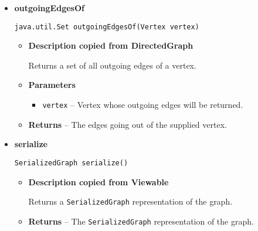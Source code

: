 {{{{{{{{{{{{{{{\begin{itemize}
{\begin{itemize}
{Returns the outdegree of a vertex of the graph.
}
\item{
{\bf  Parameters}
  \begin{itemize}
   \item{
\texttt{vertex} -- Vertex whose outdegree will be returned.}
  \end{itemize}
}%
\item{{\bf  Returns} -- 
The number of edges going out of the supplied vertex. 
}%
\end{itemize}
}%
\item{ 
{\bf  outgoingEdgesOf}\\
\begin{lstlisting}[frame=none]
java.util.Set outgoingEdgesOf(Vertex vertex)\end{lstlisting} %
\begin{itemize}
\item{
{\bf  Description copied from DirectedGraph{\small {}} }

Returns a set of all outgoing edges of a vertex.
}
\item{
{\bf  Parameters}
  \begin{itemize}
   \item{
\texttt{vertex} -- Vertex whose outgoing edges will be returned.}
  \end{itemize}
}%
\item{{\bf  Returns} -- 
The edges going out of the supplied vertex. 
}%
\end{itemize}
}%
\item{ 
{\bf  serialize}\\
\begin{lstlisting}[frame=none]
SerializedGraph serialize()\end{lstlisting} %
\begin{itemize}
\item{
{\bf  Description copied from Viewable{\small {}} }

Returns a \texttt{\small SerializedGraph}{\small 
{}} representation of the graph.
}
\item{{\bf  Returns} -- 
The \texttt{\small SerializedGraph}{\small 
{}} representation of the graph. 
}%
\end{itemize}
}%
\end{itemize}
}
}
}}}}}}}}}}}}}
